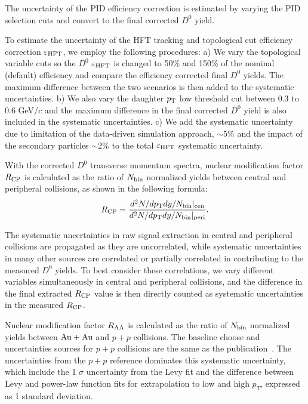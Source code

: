 \documentclass[%
 reprint,	
 amsmath,amssymb,
 aps,
 prc,
]{revtex4-1}
\begin{document}
The uncertainty of the PID efficiency correction is estimated by varying the PID selection cuts and convert to the final corrected $D^0$ yield. 


To estimate the uncertainty of the HFT tracking and topological cut efficiency correction $\varepsilon_{\rm HFT}$, we employ the following procedures: a) We vary the topological variable cuts so the $D^0$ $\varepsilon_{\rm HFT}$ is changed to 50\% and 150\% of the nominal (default) efficiency and compare the efficiency corrected final $D^0$ yields. The maximum difference between the two scenarios is then added to the systematic uncertainties. b) We also vary the daughter $p_{\rm T}$ low threshold cut between 0.3 to 0.6 GeV/$c$ and the maximum difference in the final corrected $D^0$ yield is also included in the systematic uncertainties. c) We add the systematic uncertainty due to limitation of the data-driven simulation approach, $\sim$5\% and the impact of the secondary particles $\sim$2\% to the total $\varepsilon_{\rm HFT}$ systematic uncertainty.%

With the corrected $D^0$ transverse momentum spectra, nuclear modification factor $R_{\rm CP}$ is calculated as the ratio of $N_{\rm bin}$ normalized yields between central and peripheral collisions, as shown in the following formula:
\begin{equation}
R_{\rm CP} = \frac{d^2N/dp_{\rm T}dy/N_{\rm bin}|_{\rm cen}}{d^2N/dp_{\rm T}dy/N_{\rm bin}|_{\rm peri}}.
\label{equ:equation3}
\end{equation}

The systematic uncertainties in raw signal extraction in central and peripheral collisions are propagated as they are uncorrelated, while systematic uncertainties in many other sources are correlated or partially correlated in contributing to the measured $D^0$ yields. To best consider these correlations, we vary different variables simultaneously in central and peripheral collisions, and the difference in the final extracted $R_{\rm CP}$ value is then directly counted as systematic uncertainties in the measured $R_{\rm CP}$.

Nuclear modification factor $R_{\rm AA}$ is calculated as the ratio of $N_{\rm bin}$ normalized yields between ${\rm{Au + Au}}$ and $p + p$ collisions. The baseline choose and uncertainties sources for $p + p$ collisions are the same as the publication~\cite{Star_D_RAA_corr}. The uncertainties from the $p + p$ reference dominates this systematic uncertainty, which include the 1 $\sigma$ uncertainty from the Levy fit and the difference between Levy and power-law function fits for extrapolation to low and high $p_T$, expressed as 1 standard deviation.
\end{document}
